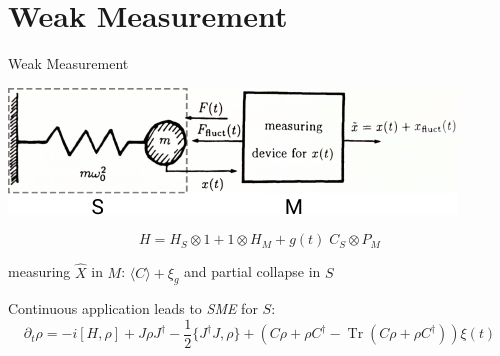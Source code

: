 \documentclass[
]{beamer}
\DeclareMathOperator{\Tr}{Tr}
\begin{document}
\section{Weak Measurement}
\begin{frame}{Weak Measurement}
	\begin{center}
		\includegraphics{figures/back_action.pdf}
	\end{center}
	$$H = H_S\otimes 1 + 1\otimes H_M + g(t) \; C_S \otimes P_M$$
	
	measuring $\hat X$ in $M$: $\langle C\rangle + \xi_g$ and partial collapse in $S$

	Continuous application leads to \emph{SME} for $S$:
	$$
		\partial_t\rho 
		= -i[H,\rho] 
		+ J\rho J^\dagger - \frac{1}{2} \{J^\dagger J, \rho\} 
		+ \left(C\rho + \rho C^\dagger - \Tr(C\rho + \rho C^\dagger)\right)\xi(t)
	$$

\end{frame}






\end{document}
